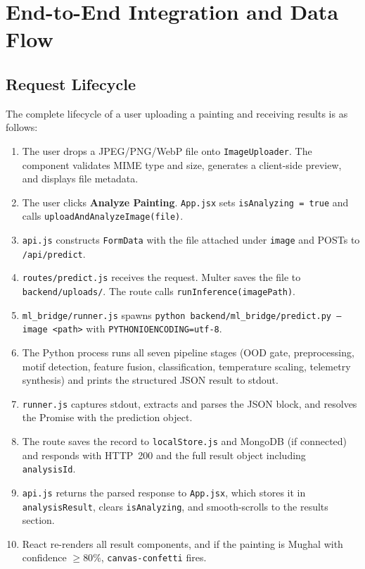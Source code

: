 \documentclass[12pt, a4paper, twoside]{article}
\begin{document}
\section{End-to-End Integration and Data Flow}
\label{sec:integration}

\subsection{Request Lifecycle}

The complete lifecycle of a user uploading a painting and receiving results is as follows:

\begin{enumerate}
  \item The user drops a JPEG/PNG/WebP file onto \texttt{ImageUploader}. The component validates MIME type and size, generates a client-side preview, and displays file metadata.
  \item The user clicks \textbf{Analyze Painting}. \texttt{App.jsx} sets \texttt{isAnalyzing = true} and calls \texttt{uploadAndAnalyzeImage(file)}.
  \item \texttt{api.js} constructs \texttt{FormData} with the file attached under \texttt{image} and POSTs to \texttt{/api/predict}.
  \item \texttt{routes/predict.js} receives the request. Multer saves the file to \texttt{backend/uploads/}. The route calls \texttt{runInference(imagePath)}.
  \item \texttt{ml\_bridge/runner.js} spawns \texttt{python backend/ml\_bridge/predict.py --image <path>} with \texttt{PYTHONIOENCODING=utf-8}.
  \item The Python process runs all seven pipeline stages (OOD gate, preprocessing, motif detection, feature fusion, classification, temperature scaling, telemetry synthesis) and prints the structured JSON result to stdout.
  \item \texttt{runner.js} captures stdout, extracts and parses the JSON block, and resolves the Promise with the prediction object.
  \item The route saves the record to \texttt{localStore.js} and MongoDB (if connected) and responds with HTTP~200 and the full result object including \texttt{analysisId}.
  \item \texttt{api.js} returns the parsed response to \texttt{App.jsx}, which stores it in \texttt{analysisResult}, clears \texttt{isAnalyzing}, and smooth-scrolls to the results section.
  \item React re-renders all result components, and if the painting is Mughal with confidence $\geq 80\%$, \texttt{canvas-confetti} fires.
\end{enumerate}
\end{document}

